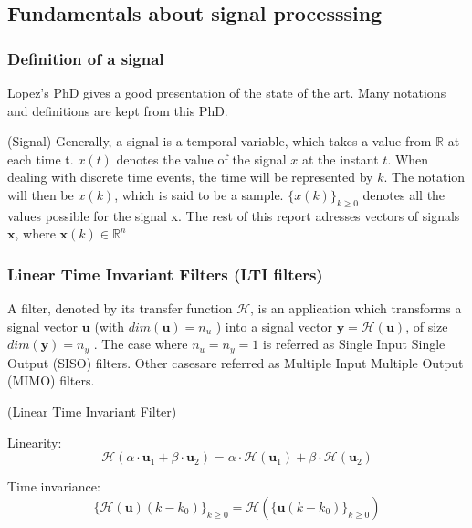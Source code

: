 	\subsection{Fundamentals about signal processsing}
	\subsubsection{Definition of a signal}
	Lopez's PhD \cite{lopez} gives a good presentation of the state of the art.
	Many notations and definitions are kept from this PhD.

	\begin{thdef}\label{sig} (Signal)
		Generally, a signal is a temporal variable, which takes a value from $\mathbb{R}$ at each time t.
		$x(t)$ denotes the value of the signal $x$ at the instant $t$.
		When dealing with discrete time events, the time will be represented by $k$.
		The notation will then be $x(k)$, which is said to be a sample.
		$\{x(k)\}_{k \geq 0}$ denotes all the values possible for the signal x.
		The rest of this report adresses vectors of signals $\textbf{x}$, where $\textbf{x}(k) \in \mathbb{R}^{n}$
	\end{thdef}

	\subsubsection{Linear Time Invariant Filters (LTI filters)}
	A filter, denoted by its transfer function $\mathcal{H}$, is an application which transforms a signal vector $\boldsymbol{u}$ (with $dim(\boldsymbol{u}) = n_u$ )
	into a signal vector $\boldsymbol{y} = \mathcal{H}(\boldsymbol{u})$, of size $dim(\boldsymbol{y}) = n_y$ . The case where $n_u = n_y = 1$ is referred as Single Input Single Output
	(SISO) filters. Other casesare referred as Multiple Input Multiple Output (MIMO) filters.

	\begin{thdef} (Linear Time Invariant Filter)

		Linearity:
		$$ \mathcal{H}(\alpha \cdot \boldsymbol{u}_1+ \beta \cdot \boldsymbol{u}_2)= \alpha\cdot\mathcal{H}(\boldsymbol{u}_1) +  \beta\cdot\mathcal{H}(\boldsymbol{u}_2)$$

		Time invariance:
		$$ \{\mathcal{H}(\boldsymbol{u})(k-k_0)\}_{k\geq0} = \mathcal{H}(\{\boldsymbol{u}(k-k_0)\}_{k \geq 0} ) $$
	\end{thdef}

